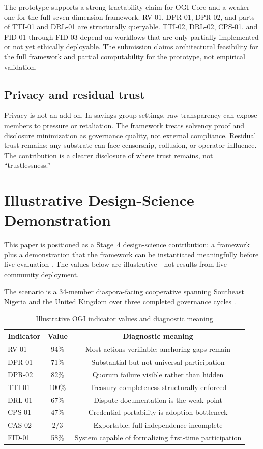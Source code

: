 \documentclass[sigconf]{acmart}
\begin{document}
The prototype supports a strong tractability claim for OGI-Core and a weaker one for the full seven-dimension framework. RV-01, DPR-01, DPR-02, and parts of TTI-01 and DRL-01 are structurally queryable. TTI-02, DRL-02, CPS-01, and FID-01 through FID-03 depend on workflows that are only partially implemented or not yet ethically deployable. The submission claims architectural feasibility for the full framework and partial computability for the prototype, not empirical validation.

\subsection{Privacy and residual trust}

Privacy is not an add-on. In savings-group settings, raw transparency can expose members to pressure or retaliation. The framework treats solvency proof and disclosure minimization as governance quality, not external compliance. Residual trust remains: any substrate can face censorship, collusion, or operator influence. The contribution is a clearer disclosure of where trust remains, not ``trustlessness.''

\section{Illustrative Design-Science Demonstration}

This paper is positioned as a Stage~4 design-science contribution: a framework plus a demonstration that the framework can be instantiated meaningfully before live evaluation \cite{hevner2004,peffers2007,gregor2013}. The values below are illustrative---not results from live community deployment.

The scenario is a 34-member diaspora-facing cooperative spanning Southeast Nigeria and the United Kingdom over three completed governance cycles \cite{besley1993,gugerty2007}.

\begin{table}[h]
\caption{Illustrative OGI indicator values and diagnostic meaning}
\label{tab:demo}
\small
\begin{tabular}{lcc}
\toprule
Indicator & Value & Diagnostic meaning \\
\midrule
RV-01  & 94\% & Most actions verifiable; anchoring gaps remain \\
DPR-01 & 71\% & Substantial but not universal participation \\
DPR-02 & 82\% & Quorum failure visible rather than hidden \\
TTI-01 & 100\% & Treasury completeness structurally enforced \\
DRL-01 & 67\% & Dispute documentation is the weak point \\
CPS-01 & 47\% & Credential portability is adoption bottleneck \\
CAS-02 & 2/3  & Exportable; full independence incomplete \\
FID-01 & 58\% & System capable of formalizing first-time participation \\
\bottomrule
\end{tabular}
\end{table}
\end{document}
